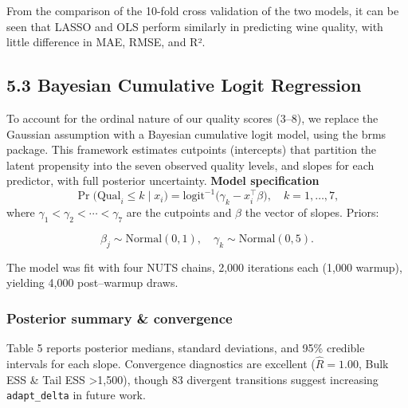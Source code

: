 \documentclass[
  doc,floatsintext]{apa6}
\begin{document}
From the comparison of the 10-fold cross validation of the two models, it can be seen that LASSO and OLS perform similarly in predicting wine quality, with little difference in MAE, RMSE, and R².

\subsection{5.3 Bayesian Cumulative Logit Regression}\label{bayesian-cumulative-logit-regression}

To account for the ordinal nature of our quality scores (3--8), we replace the Gaussian assumption with a Bayesian cumulative logit model, using the brms package. This framework estimates cutpoints (intercepts) that partition the latent propensity into the seven observed quality levels, and slopes for each predictor, with full posterior uncertainty.
\textbf{Model specification}
\[
\Pr\bigl(\text{Qual}_i \le k \mid x_i\bigr)
=\mathrm{logit}^{-1}\bigl(\gamma_k - x_i^\top\beta\bigr),
\quad k = 1,\dots,7,
\]
where \(\gamma_1<\gamma_2<\cdots<\gamma_7\) are the cutpoints and \(\beta\) the vector of slopes. Priors:

\[
\beta_j \sim \mathrm{Normal}(0,1),\quad 
\gamma_k \sim \mathrm{Normal}(0,5).
\]

The model was fit with four NUTS chains, 2,000 iterations each (1,000 warmup), yielding 4,000 post--warmup draws.

\subsubsection{\texorpdfstring{\textbf{Posterior summary \& convergence}}{Posterior summary \& convergence}}\label{posterior-summary-convergence}

Table 5 reports posterior medians, standard deviations, and 95\% credible intervals for each slope. Convergence diagnostics are excellent (\(\widehat R = 1.00\), Bulk ESS \& Tail ESS \textgreater1,500), though 83 divergent transitions suggest increasing \texttt{adapt\_delta} in future work.
\end{document}
